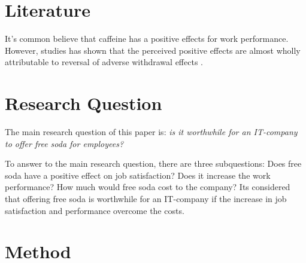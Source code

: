 \documentclass[a4paper]{article}
\begin{document}
\section{Literature}

\begin{comment}
What has been done related to this (mainly in academic publications)? 
What do the authors say about the topic? 
How does your research question relate to these previous studies? 
How do you apply them or add to them? Based on what they say, what do you say?  
\end{comment}



It's common believe that caffeine has a positive effects for work performance. However, studies has shown that the perceived positive effects are almost wholly attributable to reversal of adverse withdrawal effects \citep{james2005}.



\section{Research Question}

The main research question of this paper is: \textit{is it worthwhile for an IT-company to offer free soda for employees?} 

To answer to the main research question, there are three subquestions: Does free soda have a positive effect on job satisfaction? Does it increase the work performance? How much would free soda cost to the company? Its considered that offering free soda is worthwhile for an IT-company if the increase in job satisfaction and performance overcome the costs.

\begin{comment}
Based on what other people have studied before, what is the question that no one has really answered yet? 
What is the main question, and what are perhaps the two or three sub-questions that you need to answer to be able to answer the main question? 
Be sure of what you write, because you will have to answer to this question ☺
\end{comment}

\section{Method}

\begin{comment}
How do you find an answer to the research question? 
How do you gather data? 
From where do you gather data? 
How do you analyze the data? 
Out of all the methods in the world, why did you choose this one? 
What is good about it and what is not? 
What were the alternative methods, and what were their pros and cons? 
\end{comment}
\end{document}

